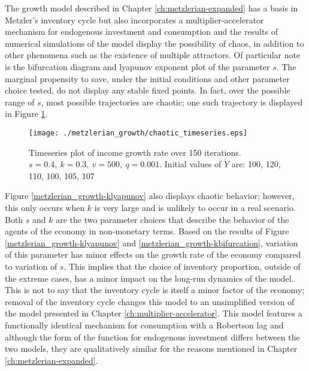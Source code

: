 The growth model described in Chapter \ref{ch:metzlerian-expanded} has a basis in Metzler's inventory cycle but also incorporates a multiplier-accelerator mechanism for endogenous investment and consumption and the results of numerical simulations of the model display the possibility of chaos, in addition to other phenomena such as the existence of multiple attractors. Of particular note is the bifurcation diagram and lyapunov exponent plot of the parameter $s$. The marginal propensity to save, under the initial conditions and other parameter choice tested, do not display any stable fixed points. In fact, over the possible range of $s$, most possible trajectories are chaotic; one such trajectory is displayed in Figure \ref{growth_chaotic-timeseries}.
\begin{figure}
    \centering
    \texttt{[image: ./metzlerian\_growth/chaotic\_timeseries.eps]}
    \caption{Timeseries plot of income growth rate over 150 iterations. $s=0.4,\ k=0.3,\ v=500,\ q=0.001$. Initial values of $\dot Y$ are: 100, 120, 110, 100, 105, 107}
    \label{growth_chaotic-timeseries}
\end{figure}
Figure \ref{metzlerian_growth-klyapunov} also displays chaotic behavior; however, this only occurs when $k$ is very large and is unlikely to occur in a real scenario. Both $s$ and $k$ are the two parameter choices that describe the behavior of the agents of the economy in non-monetary terms. Based on the results of Figure \ref{metzlerian_growth-klyapunov} and \ref{metzlerian_growth-kbifurcation}, variation of this parameter has minor effects on the growth rate of the economy compared to variation of $s$. This implies that the choice of inventory proportion, outside of the extreme cases, has a minor impact on the long-run dynamics of the model. This is not to say that the inventory cycle is itself a minor factor of the economy; removal of the inventory cycle changes this model to an unsimplified version of the model presented in Chapter \ref{ch:multiplier-accelerator}. This model features a functionally identical mechanism for consumption with a Robertson lag and although the form of the function for endogenous investment differs between the two models, they are qualitatively similar for the reasons mentioned in Chapter \ref{ch:metzlerian-expanded}.


